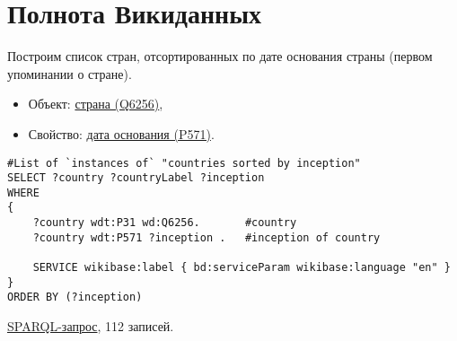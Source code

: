 \section{Полнота Викиданных}

Построим список стран, отсортированных по дате основания страны (первом упоминании о стране).

\begin{itemize}
    \item Объект: \href{https://www.wikidata.org/wiki/Q6256}{страна (Q6256)},
    \item Свойство: \href{https://www.wikidata.org/wiki/Property:P571}{дата основания (P571)}.
\end{itemize}

\begin{lstlisting}[language=SPARQL]
#List of `instances of` "countries sorted by inception" 
SELECT ?country ?countryLabel ?inception
WHERE
{
    ?country wdt:P31 wd:Q6256.       #country
    ?country wdt:P571 ?inception .   #inception of country
    
    SERVICE wikibase:label { bd:serviceParam wikibase:language "en" }
}
ORDER BY (?inception)
\end{lstlisting}


\href{https://query.wikidata.org/#%23List%20of%20%60instances%20of%60%20%22countries%20sorted%20by%20inception%22%20%0ASELECT%20%3Fcountry%20%3FcountryLabel%20%3Finception%0AWHERE%0A%7B%0A%20%20%20%20%3Fcountry%20wdt%3AP31%20wd%3AQ6256.%0A%20%20%20%20%3Fcountry%20wdt%3AP571%20%3Finception%20.%0A%20%20%20%20%0A%20%20%20%20SERVICE%20wikibase%3Alabel%20%7B%20bd%3AserviceParam%20wikibase%3Alanguage%20%22en%22%20%7D%0A%7D%0A%0AORDER%20BY%20%28%3Finception%29}{SPARQL-запрос}, 112 записей.